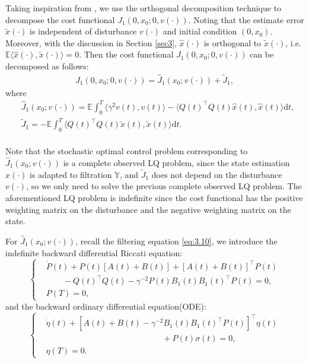 \documentclass[lettersize,journal]{IEEEtran}
\theoremstyle{plain}
\theoremstyle{definition}
\begin{document}
Taking inspiration from \cite{Sun2022}, we use the orthogonal decomposition technique to decompose the cost functional $J_1(0,x_0;0,v(\cdot))$. Noting that the estimate error $\widetilde{x}(\cdot)$ is independent of disturbance $v(\cdot)$ and initial condition $(0,x_0)$. Moreover, with the discussion in Section \ref{sec3}, $\widehat{x}(\cdot)$ is orthogonal to $\widetilde{x}(\cdot)$, i.e. $\mathbb{E}\langle\widehat{x}(\cdot),\widetilde{x}(\cdot)\rangle = 0$. Then the cost functional $J_1(0,x_0;0,v(\cdot))$ can be decomposed as follows:
\begin{equation*}
	\begin{aligned}
		J_1(0,x_0;0,v(\cdot)) = \widehat{J}_1(x_0;v(\cdot)) + \widetilde{J}_1,
	\end{aligned}
\end{equation*}
where
\begin{equation*}
	\begin{aligned}
		&\widehat{J}_1(x_0;v(\cdot)) = \mathbb{E}\int_0^T \langle\gamma^2v(t),v(t)\rangle - \langle Q(t)^{\top}Q(t)\widehat{x}(t),\widehat{x}(t)\rangle \mathrm{d}t,\\
		&\widetilde{J}_1 = - \mathbb{E}\int_0^T \langle Q(t)^{\top}Q(t)\widetilde{x}(t),\widetilde{x}(t)\rangle \mathrm{d}t.\\
	\end{aligned}
\end{equation*}

Note that the stochastic optimal control problem corresponding to $\widehat{J}_1(x_0;v(\cdot))$ is a complete observed LQ problem, since the state estimation $\widehat{x}(\cdot)$ is adapted to filtration $\mathbb{Y}$, and $\widetilde{J}_1$ does not depend on the disturbance $v(\cdot)$, so we only need to solve the previous complete observed LQ problem. The aforementioned LQ problem is indefinite since the cost functional has the positive weighting matrix on the disturbance and the negative weighting matrix on the state.

For $\widehat{J}_1(x_0;v(\cdot))$, recall the filtering equation \eqref{eq:3.10}, we introduce the indefinite backward differential Riccati equation:
\begin{equation}\label{eq:4.1}
	\left\{
	\begin{aligned}
		&\dot{P}(t) + P(t)[A(t) + B(t)] + [A(t) + B(t)]^\top P(t)\\
		&\qquad - Q(t)^\top Q(t) - \gamma^{-2}P(t)B_1(t)B_1(t)^\top{P}(t) = 0,\\
		&P(T) = 0,
	\end{aligned}
	\right.
\end{equation}
and the backward ordinary differential equation(ODE):
\begin{equation}\label{eq:4.2}
	\left\{
	\begin{aligned}
		& \dot{\eta}(t) + [A(t) + B(t) - \gamma^{-2}B_1(t)B_1(t)^\top P(t)]^\top \eta(t)\\
		&\qquad \qquad \qquad \qquad \qquad \qquad \qquad + P(t)\sigma(t)= 0,\\
		& \eta(T) = 0.
	\end{aligned}
	\right.
\end{equation}
\end{document}
